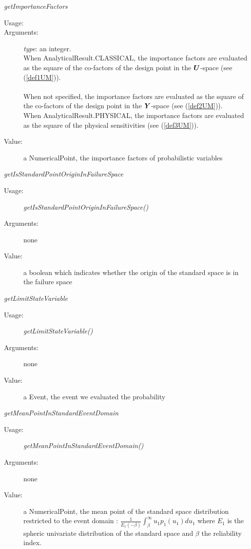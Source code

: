 \begin{description}
\begin{description}
\item \textit{getImportanceFactors}
\begin{description}
\item[Usage:] \rule{0pt}{1em}
\item[Arguments:] \textit{type}: an integer.
\\When AnalyticalResult.CLASSICAL, the importance factors are evaluated as the square of the co-factors of the design point in the ${\boldsymbol{U}}$-space (see (\ref{def1UM})).\\
\\When not specified, the importance factors are evaluated as the square of the co-factors of the design point in the ${\boldsymbol{Y}}$-space (see (\ref{def2UM})).
\\When AnalyticalResult.PHYSICAL, the importance factors are evaluated as the square of the physical sensitivities (see (\ref{def3UM})).
\item[Value:]  a NumericalPoint, the importance factors of probabilistic variables
\end{description}
\bigskip

\item \textit{getIsStandardPointOriginInFailureSpace}
\begin{description}
\item[Usage:] \textit{getIsStandardPointOriginInFailureSpace()}
\item[Arguments:] none
\item[Value:]  a boolean which indicates whether the origin of the standard space is in the failure space
\end{description}
\bigskip

\item \textit{getLimitStateVariable}
\begin{description}
\item[Usage:] \textit{getLimitStateVariable()}
\item[Arguments:] none
\item[Value:]  a Event, the event we evaluated the probability
\end{description}
\bigskip

\item \textit{getMeanPointInStandardEventDomain}
\begin{description}
\item[Usage:] \textit{getMeanPointInStandardEventDomain()}
\item[Arguments:] none
\item[Value:]  a NumericalPoint, the mean point of the standard space distribution restricted to the event domain : $\displaystyle \frac{1}{E_1(-\beta)}\int_{\beta}^{\infty} u_1 p_1(u_1)du_1$ where $E_1$ is the spheric univariate distribution of the standard space and $\beta$ the reliability index.
\end{description}


\end{description}
\end{description}
